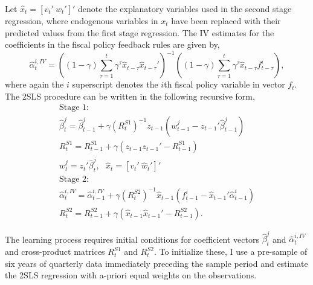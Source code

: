 \documentclass[11pt]{article}
\newcommand{\beq}{\begin{equation}}
\newcommand{\eeq}{\end{equation}}
\begin{document}
Let $\hat{x}_t = [v_t'~ \hat{w}_{t}']'$ denote the explanatory variables used in the second stage regression, where endogenous variables in $x_{t}$ have been replaced with their predicted values from the first stage regression.  The IV estimates for the coefficients in the fiscal policy feedback rules are given by,
\beq \label{eq:iv2} \hat{\alpha}_t^{i,IV} = \left( (1-\gamma)  \sum_{\tau=1}^{t} \gamma^{\tau} \hat{x}_{t-\tau} \hat{x}_{t-\tau}' \right)^{-1}  \left( (1-\gamma)  \sum_{\tau=1}^{t} \gamma^{\tau} \hat{x}_{t-\tau}  f^i_{t-\tau} \right), \eeq
where again the $i$ superscript denotes the $i$th fiscal policy variable in vector $f_t$.  The 2SLS procedure can be written in the following recursive form,
\beq \label{lniv} \begin{array}{c}
\mbox{Stage 1:} \\ [0.5pc]
 \hat{\beta}^j_t = \hat{\beta}^j_{t-1} + \gamma \left(R_t^{S1}\right)^{-1} z_{t-1} \left(w^j_{t-1} - z_{t-1}'\hat{\beta}^j_{t-1}\right) \\ [0.5pc]
 R_t^{S1} = R_{t-1}^{S1} + \gamma \left(z_{t-1} z_{t-1}' - R_{t-1}^{S1}\right) \\ [0.5pc]
 \hat{w}^j_{t} = z_{t}' \hat{\beta}^j_t,~~~  \hat{x}_t = [v_t'~ \hat{w}_t']' \\ [1pc]
\mbox{Stage 2:} \\ [0.5pc]
 \hat{\alpha}_t^{i,IV} = \hat{\alpha}_{t-1}^{i,IV} + \gamma \left(R_t^{S2}\right)^{-1} \hat{x}_{t-1} \left(f^i_{t-1} - \hat{x}_{t-1}'\hat{\alpha}^i_{t-1}\right) \\ [0.5pc]
 R_t^{S2} = R_{t-1}^{S2} + \gamma \left(\hat{x}_{t-1} \hat{x}_{t-1}' - R_{t-1}^{S2}\right). 
\end{array} \eeq

The learning process requires initial conditions for coefficient vectors $\hat{\beta}^j_t$ and $\hat{\alpha}_t^{i,IV}$ and cross-product matrices $R_t^{S1}$ and $R_t^{S2}$.  To initialize these, I use a pre-sample of six years of quarterly data immediately preceding the sample period and estimate the 2SLS regression with a-priori equal weights on the observations.  
\end{document}
